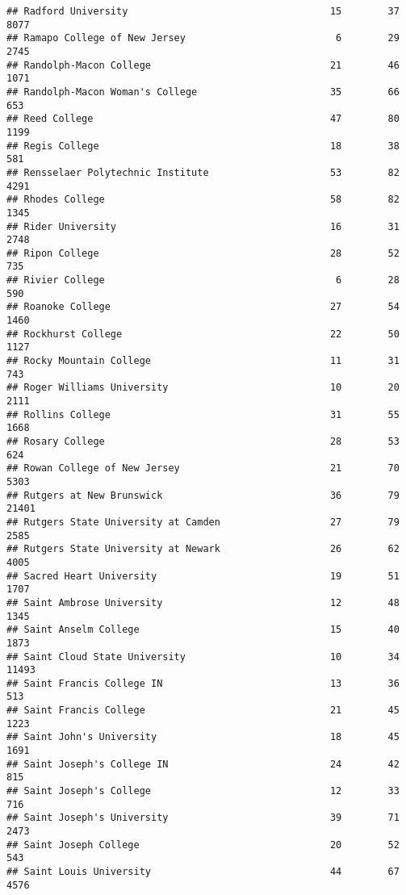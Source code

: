 \documentclass[
]{article}
\begin{document}
\begin{verbatim}
## Radford University                                   15        37        8077
## Ramapo College of New Jersey                          6        29        2745
## Randolph-Macon College                               21        46        1071
## Randolph-Macon Woman's College                       35        66         653
## Reed College                                         47        80        1199
## Regis College                                        18        38         581
## Rensselaer Polytechnic Institute                     53        82        4291
## Rhodes College                                       58        82        1345
## Rider University                                     16        31        2748
## Ripon College                                        28        52         735
## Rivier College                                        6        28         590
## Roanoke College                                      27        54        1460
## Rockhurst College                                    22        50        1127
## Rocky Mountain College                               11        31         743
## Roger Williams University                            10        20        2111
## Rollins College                                      31        55        1668
## Rosary College                                       28        53         624
## Rowan College of New Jersey                          21        70        5303
## Rutgers at New Brunswick                             36        79       21401
## Rutgers State University at Camden                   27        79        2585
## Rutgers State University at Newark                   26        62        4005
## Sacred Heart University                              19        51        1707
## Saint Ambrose University                             12        48        1345
## Saint Anselm College                                 15        40        1873
## Saint Cloud State University                         10        34       11493
## Saint Francis College IN                             13        36         513
## Saint Francis College                                21        45        1223
## Saint John's University                              18        45        1691
## Saint Joseph's College IN                            24        42         815
## Saint Joseph's College                               12        33         716
## Saint Joseph's University                            39        71        2473
## Saint Joseph College                                 20        52         543
## Saint Louis University                               44        67        4576

\end{verbatim}
\end{document}
